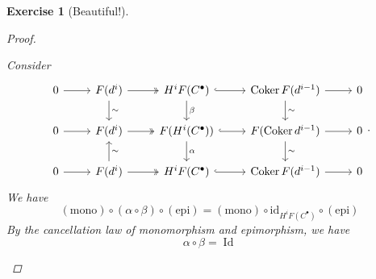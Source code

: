 \documentclass{article}
\theoremstyle{breakstyle}
\newtheorem{exercise}{Exercise}[section]
\DeclareMathOperator{\id}{Id}
\DeclareMathOperator{\coker}{Coker}
\let\ker\relax
\DeclareMathOperator{\ker}{Ker}
\begin{document}
\begin{exercise}[Beautiful!]
\begin{proof}
\begin{enumerate}[label=({\roman*})]
            Consider
            $$
            \begin{tikzcd}
            0 \arrow[r] & \ker{F(d^i)} \arrow[r, two heads] \arrow[d, "\sim"]  & H^iF(C^\bullet) \arrow[r, hook] \arrow[d, "\beta"]    & \coker{F(d^{i-1})} \arrow[d, "\sim"] \arrow[r] & 0 \\
            0 \arrow[r] & F(\ker{d^i}) \arrow[r, two heads]                    & F(H^i(C^\bullet)) \arrow[r, hook] \arrow[d, "\alpha"] & F(\coker{d^{i-1}}) \arrow[d, "\sim"] \arrow[r] & 0 \\
            0 \arrow[r] & \ker{F(d^i)} \arrow[u, "\sim"'] \arrow[r, two heads] & H^iF(C^\bullet) \arrow[r, hook]                       & \coker{F(d^{i-1})} \arrow[r]                   & 0
            \end{tikzcd}
            .$$
            We have
            $$
            (\text{mono}) \circ (\alpha \circ \beta) \circ (\text{epi}) =
            (\text{mono}) \circ \text{id}_{H^iF(C^\bullet)} \circ (\text{epi})
            $$
            By the cancellation law of monomorphism and epimorphism, we have
            $$
            \alpha\circ \beta=\id
            $$
    \end{enumerate}
\end{proof}

\end{exercise}
\end{document}
